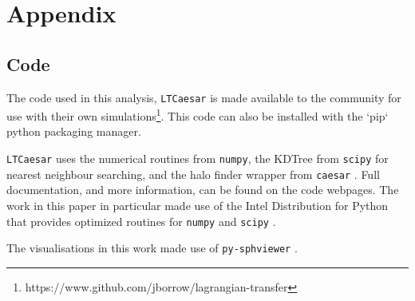 \section{Appendix}
\label{sec:appendix}

\subsection{Code}

The code used in this analysis, {\tt LTCaesar} is made available to the
community for use with their own
simulations\footnote{https://www.github.com/jborrow/lagrangian-transfer}. This
code can also be installed with the `pip` python packaging manager.

{\tt LTCaesar} uses the numerical routines from {\tt numpy}, the KDTree from
{\tt scipy} for nearest neighbour searching, and the halo finder wrapper from
{\tt caesar} \citep{NumPy2018, Jones2001, Thompson2018}. Full documentation,
and more information, can be found on the code webpages. The work in this paper
in particular made use of the Intel Distribution for Python that provides
optimized routines for {\tt numpy} and {\tt scipy} \citep{Pavlyk2017}.

The visualisations in this work made use of {\tt py-sphviewer}
\citep{Benitez-Llambay2015}.

